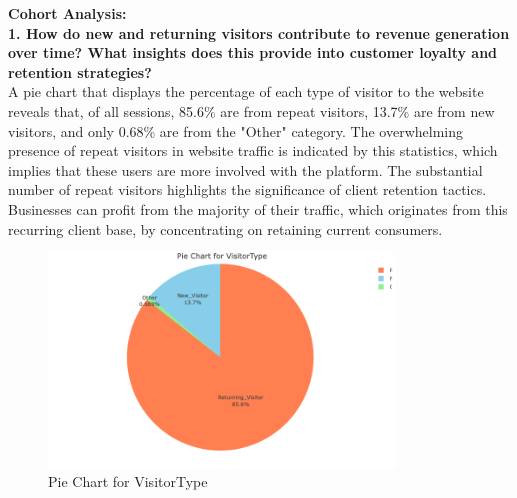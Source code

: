 \documentclass[12pt]{article}
\begin{document}
\textbf{Cohort Analysis:}\\

\textbf{1. How do new and returning visitors contribute to revenue generation over time? What insights does this provide into customer loyalty and retention strategies?} \\[5pt] %

A pie chart that displays the percentage of each type of visitor to the website reveals that, of all sessions, 85.6\% are from repeat visitors, 13.7\% are from new visitors, and only 0.68\% are from the "Other" category. The overwhelming presence of repeat visitors in website traffic is indicated by this statistics, which implies that these users are more involved with the platform. The substantial number of repeat visitors highlights the significance of client retention tactics. Businesses can profit from the majority of their traffic, which originates from this recurring client base, by concentrating on retaining current consumers.
\begin{figure}[h]
    \centering
    \includegraphics[width=0.82\textwidth]{Pie Chart for VisitorType.png}  
    \caption{Pie Chart for VisitorType}
\end{figure}
\vspace{0.5cm}
\end{document}
